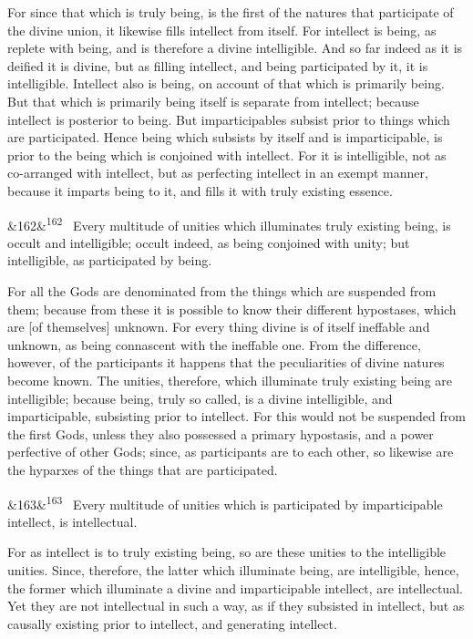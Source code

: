 \documentclass[12pt]{article}
\newcommand{\para}[1][]{\par\noindent\ifx&#1&\else\textsuperscript{\footnotesize #1}~\fi}
\begin{document}
For since that which is truly being, is the first of the natures that participate of the divine union, it likewise fills intellect from itself. For intellect is being, as replete with being, and is therefore a divine intelligible. And so far indeed as it is deified it is divine, but as filling intellect, and being participated by it, it is intelligible. Intellect also is being, on account of that which is primarily being. But that which is primarily being itself is separate from intellect; because intellect is posterior to being. But imparticipables subsist prior to things which are participated. Hence being which subsists by itself and is imparticipable, is prior to the being which is conjoined with intellect. For it is intelligible, not as co-arranged with intellect, but as perfecting intellect in an exempt manner, because it imparts being to it, and fills it with truly existing essence.

\para[162] Every multitude of unities which illuminates truly existing being, is occult and intelligible; occult indeed, as being conjoined with unity; but intelligible, as participated by being.

For all the Gods are denominated from the things which are suspended from them; because from these it is possible to know their different hypostases, which are [of themselves] unknown. For every thing divine is of itself ineffable and unknown, as being connascent with the ineffable one. From the difference, however, of the participants it happens that the peculiarities of divine natures become known. The unities, therefore, which illuminate truly existing being are intelligible; because being, truly so called, is a divine intelligible, and imparticipable, subsisting prior to intellect. For this would not be suspended from the first Gods, unless they also possessed a primary hypostasis, and a power perfective of other Gods; since, as participants are to each other, so likewise are the hyparxes of the things that are participated.

\para[163] Every multitude of unities which is participated by imparticipable intellect, is intellectual.

For as intellect is to truly existing being, so are these unities to the intelligible unities. Since, therefore, the latter which illuminate being, are intelligible, hence, the former which illuminate a divine and imparticipable intellect, are intellectual. Yet they are not intellectual in such a way, as if they subsisted in intellect, but as causally existing prior to intellect, and generating intellect.
\end{document}
